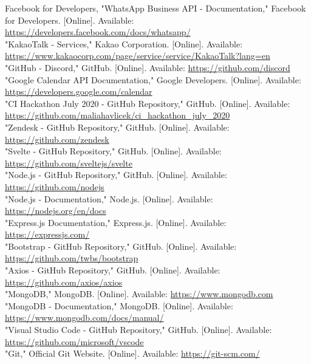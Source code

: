 \documentclass[conference]{IEEEtran}
\begin{document}
\begin{thebibliography}{00}
 Facebook for Developers, "WhatsApp Business API - Documentation," Facebook for Developers. [Online]. Available: \url{https://developers.facebook.com/docs/whatsapp/}\\
 "KakaoTalk - Services," Kakao Corporation. [Online]. Available: \url{https://www.kakaocorp.com/page/service/service/KakaoTalk?lang=en}\\
 "GitHub - Discord," GitHub. [Online]. Available: \url{https://github.com/discord}\\
 "Google Calendar API Documentation," Google Developers. [Online]. Available: \url{https://developers.google.com/calendar}\\
 "CI Hackathon July 2020 - GitHub Repository," GitHub. [Online]. Available: \url{https://github.com/maliahavlicek/ci\_hackathon\_july\_2020}\\
 "Zendesk - GitHub Repository," GitHub. [Online]. Available: \url{https://github.com/zendesk}\\
 "Svelte - GitHub Repository," GitHub. [Online]. Available: \url{https://github.com/sveltejs/svelte}\\
 "Node.js - GitHub Repository," GitHub. [Online]. Available: \url{https://github.com/nodejs}\\
 "Node.js - Documentation," Node.js. [Online]. Available: \url{https://nodejs.org/en/docs}\\
 "Express.js Documentation," Express.js. [Online]. Available: \url{https://expressjs.com/}\\
 "Bootstrap - GitHub Repository," GitHub. [Online]. Available: \url{https://github.com/twbs/bootstrap}\\
 "Axios - GitHub Repository," GitHub. [Online]. Available: \url{https://github.com/axios/axios}\\
 "MongoDB," MongoDB. [Online]. Available: \url{https://www.mongodb.com}\\
 "MongoDB - Documentation," MongoDB. [Online]. Available: \url{https://www.mongodb.com/docs/manual/}\\
 "Visual Studio Code - GitHub Repository," GitHub. [Online]. Available: \url{https://github.com/microsoft/vscode}\\
 "Git," Official Git Website. [Online]. Available: \url{https://git-scm.com/}\\

\end{thebibliography}
\end{document}
